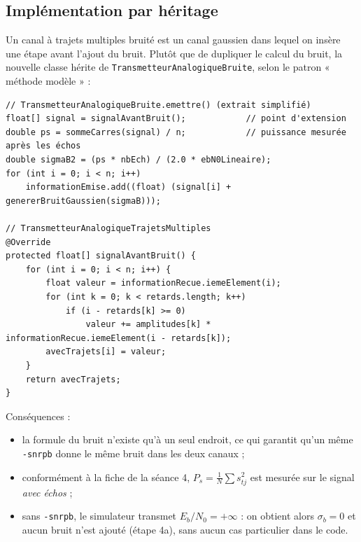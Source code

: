\documentclass[11pt,a4paper]{article}
\newcommand{\EbNo}{E_b/N_0}
\newcommand{\cls}[1]{\texttt{#1}}
\begin{document}
\subsection{Implémentation par héritage}\label{sec:heritage}
Un canal à trajets multiples bruité est un canal gaussien dans lequel on insère une étape avant l'ajout du bruit. Plutôt que de dupliquer le calcul du bruit, la nouvelle classe hérite de \cls{TransmetteurAnalogiqueBruite}, selon le patron « méthode modèle » :
\begin{center}\end{center}
\begin{lstlisting}
// TransmetteurAnalogiqueBruite.emettre() (extrait simplifié)
float[] signal = signalAvantBruit();            // point d'extension
double ps = sommeCarres(signal) / n;            // puissance mesurée après les échos
double sigmaB2 = (ps * nbEch) / (2.0 * ebN0Lineaire);
for (int i = 0; i < n; i++)
    informationEmise.add((float) (signal[i] + genererBruitGaussien(sigmaB)));

// TransmetteurAnalogiqueTrajetsMultiples
@Override
protected float[] signalAvantBruit() {
    for (int i = 0; i < n; i++) {
        float valeur = informationRecue.iemeElement(i);
        for (int k = 0; k < retards.length; k++)
            if (i - retards[k] >= 0)
                valeur += amplitudes[k] * informationRecue.iemeElement(i - retards[k]);
        avecTrajets[i] = valeur;
    }
    return avecTrajets;
}
\end{lstlisting}
Conséquences :
\begin{itemize}
  \item la formule du bruit n'existe qu'à un seul endroit, ce qui garantit qu'un même \texttt{-snrpb} donne le même bruit dans les deux canaux ;
  \item conformément à la fiche de la séance 4, $P_s = \frac1N\sum s_{tj}^2$ est mesurée sur le signal \emph{avec échos} ;
  \item sans \texttt{-snrpb}, le simulateur transmet $\EbNo = +\infty$ : on obtient alors $\sigma_b = 0$ et aucun bruit n'est ajouté (étape 4a), sans aucun cas particulier dans le code.
\end{itemize}
\end{document}

